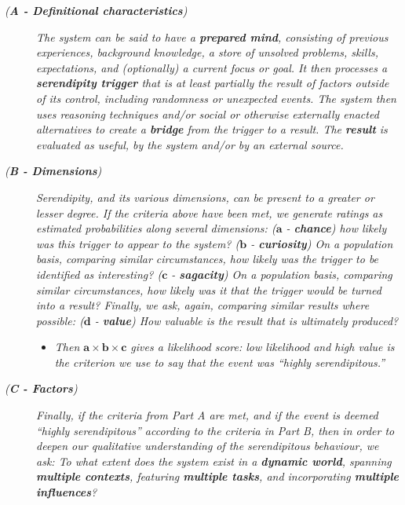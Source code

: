 \begin{description}
\item[\emph{(\textbf{A - Definitional characteristics})}] \emph{The
  system can be said to have a \emph{\textbf{prepared mind}},
  consisting of previous experiences, background knowledge, a store of
  unsolved problems, skills, expectations, and (optionally) a current
  focus or goal.  It then processes a \emph{\textbf{serendipity
  trigger}} that is at least partially the result of factors outside
  of its control, including randomness or unexpected events.  The
  system then uses reasoning techniques and/or social or otherwise
  externally enacted alternatives to create a \emph{\textbf{bridge}}
  from the trigger to a result.  The \emph{\textbf{result}} is
  evaluated as useful, by the system and/or by an external source.}
\item[\emph{(\textbf{B - Dimensions})}] \emph{Serendipity, and its
  various dimensions, can be present to a greater or lesser degree.
  If the criteria above have been met, we generate ratings as
  estimated probabilities along several dimensions:
%
\emph{($\mathbf{a}$ - \textbf{chance})} how likely was this trigger to appear to
  the system?
%
\emph{($\mathbf{b}$ - \textbf{curiosity})} On a population basis, comparing
  similar circumstances, how likely was the trigger to be identified
  as interesting?
%
\emph{($\mathbf{c}$ - \textbf{sagacity})} On a population basis, comparing
  similar circumstances, how likely was it that the trigger
  would be turned into a result?
%
Finally, we ask, again, comparing similar results where possible:
\emph{($\mathbf{d}$ - \textbf{value})} How valuable is the result that
is ultimately produced?}
\begin{itemize}
\item \emph{Then $\mathbf{a}\times\mathbf{b}\times\mathbf{c}$ gives a
  likelihood score: low likelihood and high value is the criterion we use to say that the event was ``highly serendipitous.''}
\end{itemize}
\item[\emph{(\textbf{C - Factors})}] \emph{Finally, if the criteria
  from Part A are met, and if the event is deemed ``highly
  serendipitous'' according to the criteria in Part B, then in order
  to deepen our qualitative understanding of the serendipitous
  behaviour, we ask: To what extent does the system exist in a
  \emph{\textbf{dynamic world}}, spanning \emph{\textbf{multiple
      contexts}}, featuring \emph{\textbf{multiple tasks}}, and
  incorporating \emph{\textbf{multiple influences}}?}
\end{description}

